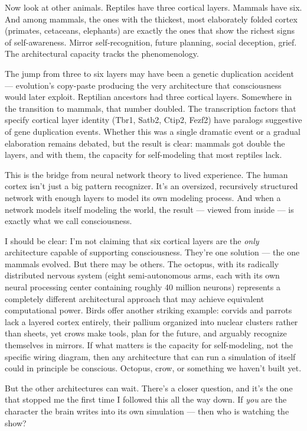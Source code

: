 \documentclass[11pt, twoside, openright]{book}
\begin{document}
Now look at other animals. Reptiles have three cortical layers. Mammals have six. And among mammals, the ones with the thickest, most elaborately folded cortex (primates, cetaceans, elephants) are exactly the ones that show the richest signs of self-awareness. Mirror self-recognition, future planning, social deception, grief. The architectural capacity tracks the phenomenology.

The jump from three to six layers may have been a genetic duplication accident --- evolution's copy-paste producing the very architecture that consciousness would later exploit. Reptilian ancestors had three cortical layers. Somewhere in the transition to mammals, that number doubled. The transcription factors that specify cortical layer identity (Tbr1, Satb2, Ctip2, Fezf2) have paralogs suggestive of gene duplication events. Whether this was a single dramatic event or a gradual elaboration remains debated, but the result is clear: mammals got double the layers, and with them, the capacity for self-modeling that most reptiles lack.

This is the bridge from neural network theory to lived experience. The human cortex isn't just a big pattern recognizer. It's an oversized, recursively structured network with enough layers to model its own modeling process. And when a network models itself modeling the world, the result --- viewed from inside --- is exactly what we call consciousness.

I should be clear: I'm not claiming that six cortical layers are the \textit{only} architecture capable of supporting consciousness. They're one solution --- the one mammals evolved. But there may be others. The octopus, with its radically distributed nervous system (eight semi-autonomous arms, each with its own neural processing center containing roughly 40 million neurons) represents a completely different architectural approach that may achieve equivalent computational power. Birds offer another striking example: corvids and parrots lack a layered cortex entirely, their pallium organized into nuclear clusters rather than sheets, yet crows make tools, plan for the future, and arguably recognize themselves in mirrors. If what matters is the capacity for self-modeling, not the specific wiring diagram, then any architecture that can run a simulation of itself could in principle be conscious. Octopus, crow, or something we haven't built yet.

But the other architectures can wait. There's a closer question, and it's the one that stopped me the first time I followed this all the way down. If \textit{you} are the character the brain writes into its own simulation --- then who is watching the show?
\end{document}
